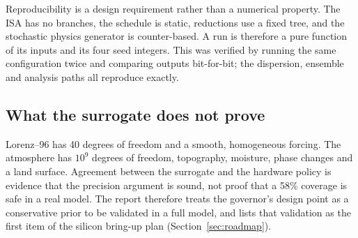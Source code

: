 Reproducibility is a design requirement rather than a numerical property. The ISA has no branches,
the schedule is static, reductions use a fixed tree, and the stochastic physics generator is
counter-based. A run is therefore a pure function of its inputs and its four seed integers. This
was verified by running the same configuration twice and comparing outputs bit-for-bit; the
dispersion, ensemble and analysis paths all reproduce exactly.

\subsection{What the surrogate does not prove}
Lorenz--96 has 40 degrees of freedom and a smooth, homogeneous forcing. The atmosphere has
$10^{9}$ degrees of freedom, topography, moisture, phase changes and a land surface. Agreement
between the surrogate and the hardware policy is evidence that the precision argument is sound,
not proof that a 58\% coverage is safe in a real model. The report therefore treats the governor's
design point as a conservative prior to be validated in a full model, and lists that validation as
the first item of the silicon bring-up plan (Section~\ref{sec:roadmap}).
